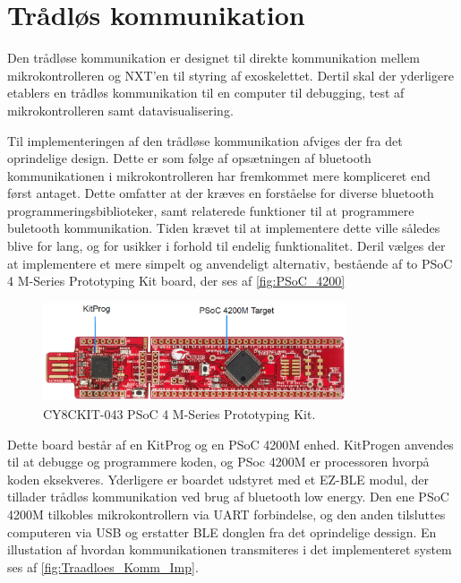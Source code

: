 \section{Trådløs kommunikation}
Den trådløse kommunikation er designet til direkte kommunikation mellem mikrokontrolleren og NXT'en til styring af exoskelettet. Dertil skal der yderligere etablers en trådløs kommunikation til en computer til debugging, test af mikrokontrolleren samt datavisualisering.   

\noindent
Til implementeringen af den trådløse kommunikation afviges der fra det oprindelige design. Dette er som følge af opsætningen af bluetooth kommunikationen i mikrokontrolleren har fremkommet mere kompliceret end først antaget. Dette omfatter at der kræves en forståelse for diverse bluetooth programmeringsbiblioteker, samt relaterede funktioner til at programmere buletooth kommunikation. Tiden krævet til at implementere dette ville således blive for lang, og for usikker i forhold til endelig funktionalitet. Deril vælges der at implementere et mere simpelt og anvendeligt alternativ, bestående af to PSoC 4 M-Series Prototyping Kit board, der ses af \autoref{fig:PSoC_4200}

\begin{figure}[H]
	\centering
	\includegraphics[width=0.8\textwidth]{figures/PSoC_4200_opdelt}
	\caption{CY8CKIT-043 PSoC 4 M-Series Prototyping Kit\citep{cypress42015}.}
	\label{fig:PSoC_4200}
\end{figure}

Dette board består af en KitProg og en PSoC 4200M enhed. KitProgen anvendes til at debugge og programmere koden, og PSoc 4200M er processoren hvorpå koden eksekveres. Yderligere er boardet udstyret med et EZ-BLE modul, der tillader trådløs kommunikation ved brug af bluetooth low energy. 
Den ene PSoC 4200M tilkobles mikrokontrollern via UART forbindelse, og den anden tilsluttes computeren via USB og erstatter BLE donglen fra det oprindelige dessign. En illustation af hvordan kommunikationen transmiteres i det implementeret system ses af \autoref{fig:Traadloes_Komm_Imp}.

